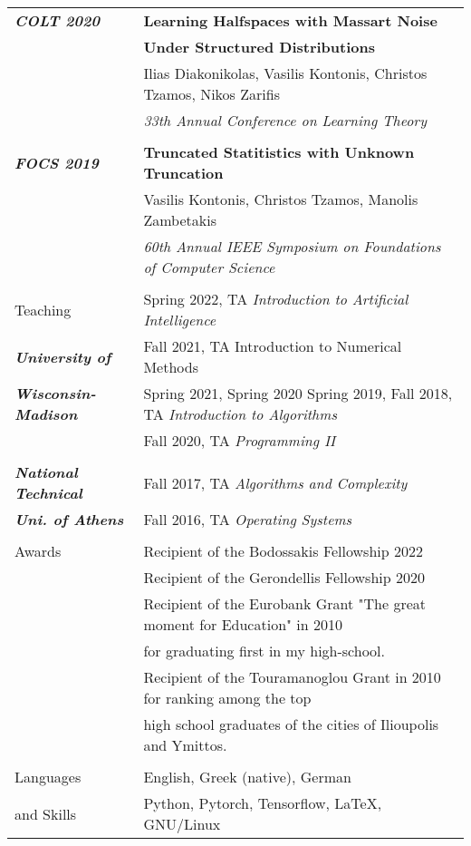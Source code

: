 \documentclass[letterpaper,11pt,oneside]{article}
\begin{document}
\begin{longtable}{@{} l l}
\emph{\textbf{COLT 2020}}
     &\textbf{Learning Halfspaces with Massart Noise}\\
     &\textbf{Under Structured Distributions}\\
     & Ilias Diakonikolas, Vasilis Kontonis, Christos Tzamos, Nikos Zarifis \\
     & \emph{33th Annual Conference on Learning Theory} \\
     & \\

\emph{\textbf{FOCS 2019}}
     & \textbf{Truncated Statitistics with Unknown Truncation} \\
     & Vasilis Kontonis, Christos Tzamos, Manolis Zambetakis\\
     & \emph{60th Annual IEEE Symposium on Foundations of Computer Science} \\
     & \\


  \Large{Teaching}

  & Spring 2022, TA \emph{Introduction to Artificial Intelligence} \\
  \emph{\textbf{University of}}
  & Fall 2021, TA  Introduction to Numerical Methods \\
  \emph{\textbf{Wisconsin-Madison}}
  & Spring 2021, Spring 2020 Spring 2019, Fall 2018, TA \emph{Introduction to Algorithms}\\
  & Fall 2020, TA \emph{Programming II}\\
   & \\
   \emph{\textbf{National Technical }}
  & Fall 2017, TA  \emph{Algorithms and Complexity}  \\
  \emph{\textbf{Uni. of Athens} }
  & Fall 2016, TA \emph{Operating Systems}  \\
  & \\


\Large{Awards}

 & Recipient of the Bodossakis Fellowship 2022 \\

 & Recipient of the Gerondellis Fellowship 2020 \\

 & Recipient of the Eurobank Grant "The great moment for Education" in 2010\\
 & for graduating first in my high-school. \\

 & Recipient of the Touramanoglou Grant in 2010 for ranking among the top \\
 & high school graduates of the cities of Ilioupolis and Ymittos. \\
 &\\

  \Large{Languages}   & English, Greek (native), German \\
\Large{and Skills}    & Python, Pytorch, Tensorflow, \LaTeX, GNU/Linux\\

\end{longtable}
\end{document}
